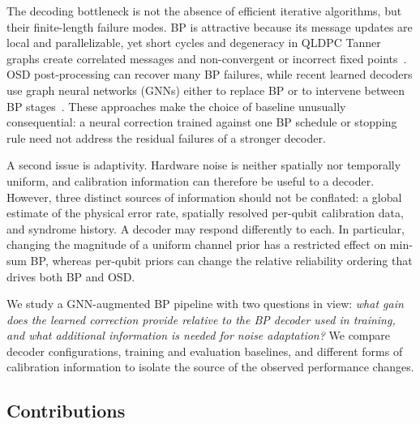 \documentclass[a4paper,twocolumn,11pt,nopdfoutputerror]{quantumarticle}
\begin{document}
The decoding bottleneck is not the absence of efficient iterative
algorithms, but their finite-length failure modes. BP is attractive
because its message updates are local and parallelizable, yet short
cycles and degeneracy in QLDPC Tanner graphs create correlated messages
and non-convergent or incorrect fixed points~\cite{Roffe2020Landscape}.
OSD post-processing can recover many BP failures, while recent learned
decoders use graph neural networks (GNNs) either to replace BP or to
intervene between BP stages~\cite{Gong2024GNN,Maan2025MLBP}. These
approaches make the choice of baseline unusually consequential: a neural
correction trained against one BP schedule or stopping rule need not
address the residual failures of a stronger decoder.

A second issue is adaptivity. Hardware noise is neither spatially nor
temporally uniform, and calibration information can therefore be useful
to a decoder. However, three distinct sources of information should not
be conflated: a global estimate of the physical error rate, spatially
resolved per-qubit calibration data, and syndrome history. A decoder may
respond differently to each. In particular, changing the magnitude of a
uniform channel prior has a restricted effect on min-sum BP, whereas
per-qubit priors can change the relative reliability ordering that drives
both BP and OSD.

We study a GNN-augmented BP pipeline with two questions in view:
\emph{what gain does the learned correction provide relative to the BP
decoder used in training, and what additional information is needed for
noise adaptation?} We compare decoder configurations, training and
evaluation baselines, and different forms of calibration information to
isolate the source of the observed performance changes.

\subsection{Contributions}\label{sec:contributions}
\end{document}
